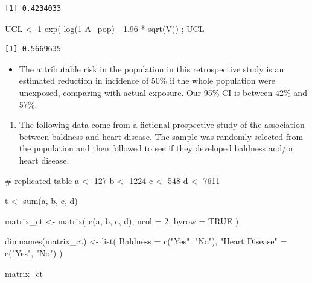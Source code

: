 \documentclass[
  letterpaper,
  DIV=11,
  numbers=noendperiod]{scrartcl}
\newenvironment{Shaded}{\begin{snugshade}}{\end{snugshade}}
\newcommand{\AttributeTok}[1]{\textcolor[rgb]{0.40,0.45,0.13}{#1}}
\newcommand{\CommentTok}[1]{\textcolor[rgb]{0.37,0.37,0.37}{#1}}
\newcommand{\ConstantTok}[1]{\textcolor[rgb]{0.56,0.35,0.01}{#1}}
\newcommand{\DecValTok}[1]{\textcolor[rgb]{0.68,0.00,0.00}{#1}}
\newcommand{\FloatTok}[1]{\textcolor[rgb]{0.68,0.00,0.00}{#1}}
\newcommand{\FunctionTok}[1]{\textcolor[rgb]{0.28,0.35,0.67}{#1}}
\newcommand{\NormalTok}[1]{\textcolor[rgb]{0.00,0.23,0.31}{#1}}
\newcommand{\OtherTok}[1]{\textcolor[rgb]{0.00,0.23,0.31}{#1}}
\newcommand{\SpecialCharTok}[1]{\textcolor[rgb]{0.37,0.37,0.37}{#1}}
\newcommand{\StringTok}[1]{\textcolor[rgb]{0.13,0.47,0.30}{#1}}
\providecommand{\tightlist}{%
  \setlength{\itemsep}{0pt}\setlength{\parskip}{0pt}}\usepackage{longtable,booktabs,array}
\begin{document}
\begin{verbatim}
[1] 0.4234033
\end{verbatim}

\begin{Shaded}
\begin{Highlighting}[]
\NormalTok{UCL }\OtherTok{\textless{}{-}}  \DecValTok{1}\SpecialCharTok{{-}}\FunctionTok{exp}\NormalTok{( }\FunctionTok{log}\NormalTok{(}\DecValTok{1}\SpecialCharTok{{-}}\NormalTok{A\_pop) }\SpecialCharTok{{-}} \FloatTok{1.96} \SpecialCharTok{*} \FunctionTok{sqrt}\NormalTok{(V))  ; UCL}
\end{Highlighting}
\end{Shaded}

\begin{verbatim}
[1] 0.5669635
\end{verbatim}

\begin{itemize}
\tightlist
\item
  The attributable risk in the population in this retrospective study is
  an estimated reduction in incidence of 50\% if the whole population
  were unexposed, comparing with actual exposure. Our 95\% CI is between
  42\% and 57\%.
\end{itemize}

\newpage

\begin{enumerate}
\def\labelenumi{\arabic{enumi}.}
\setcounter{enumi}{2}
\tightlist
\item
  The following data come from a fictional prospective study of the
  association between baldness and heart disease. The sample was
  randomly selected from the population and then followed to see if they
  developed baldness and/or heart disease.
\end{enumerate}

\begin{Shaded}
\begin{Highlighting}[]
\CommentTok{\# replicated table}
\NormalTok{a }\OtherTok{\textless{}{-}} \DecValTok{127}
\NormalTok{b }\OtherTok{\textless{}{-}} \DecValTok{1224} 
\NormalTok{c }\OtherTok{\textless{}{-}} \DecValTok{548}
\NormalTok{d }\OtherTok{\textless{}{-}} \DecValTok{7611}

\NormalTok{t }\OtherTok{\textless{}{-}} \FunctionTok{sum}\NormalTok{(a, b, c, d)}

\NormalTok{matrix\_ct }\OtherTok{\textless{}{-}} \FunctionTok{matrix}\NormalTok{(}
  \FunctionTok{c}\NormalTok{(a, b, c, d),}
  \AttributeTok{ncol =} \DecValTok{2}\NormalTok{,}
  \AttributeTok{byrow =} \ConstantTok{TRUE}
\NormalTok{)}

\FunctionTok{dimnames}\NormalTok{(matrix\_ct) }\OtherTok{\textless{}{-}} \FunctionTok{list}\NormalTok{(}
  \AttributeTok{Baldness =} \FunctionTok{c}\NormalTok{(}\StringTok{"Yes"}\NormalTok{, }\StringTok{"No"}\NormalTok{),}
  \StringTok{"Heart Disease"} \OtherTok{=} \FunctionTok{c}\NormalTok{(}\StringTok{"Yes"}\NormalTok{, }\StringTok{"No"}\NormalTok{)}
\NormalTok{)}

\NormalTok{matrix\_ct}
\end{Highlighting}
\end{Shaded}
\end{document}
